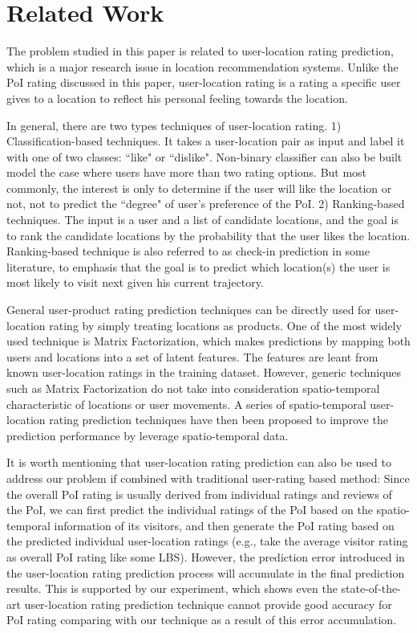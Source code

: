 \section{Related Work}\label{sec:rw}

The problem studied in this paper is related to user-location rating prediction, which is a major research issue in location recommendation systems. Unlike the PoI rating discussed in this paper, user-location rating is a rating a specific user gives to a location to reflect his personal feeling towards the location. 

In general, there are two types techniques of user-location rating. 1) Classification-based techniques. It takes a user-location pair as input and label it with one of two classes: ``like" or ``dislike". Non-binary classifier can also be built model the case where users have more than two rating options. But most commonly, the interest is only to determine if the user will like the location or not, not to predict the ``degree" of user's preference of the PoI. 2) Ranking-based techniques. The input is a user and a list of candidate locations, and the goal is to rank the candidate locations by the probability that the user likes the location. Ranking-based technique is also referred to as check-in prediction in some literature, to emphasis that the goal is to predict which location(s) the user is most likely to visit next given his current trajectory.

General user-product rating prediction techniques can be directly used for user-location rating by simply treating locations as products. One of the most widely used technique is Matrix Factorization, which makes predictions by mapping both users and locations into a set of latent features. The features are leant from known user-location ratings in the training dataset. However, generic techniques such as Matrix Factorization do not take into consideration spatio-temporal characteristic of locations or user movements. A series of spatio-temporal user-location rating prediction techniques have then been proposed to improve the prediction performance by leverage spatio-temporal data. 


It is worth mentioning that user-location rating prediction can also be used to address our problem if combined with traditional user-rating based method: Since the overall PoI rating is usually derived from individual ratings and reviews of the PoI, we can first predict the individual ratings of the PoI based on the spatio-temporal information of its visitors, and then generate the PoI rating based on the predicted individual user-location ratings (e.g., take the average visitor rating as overall PoI rating like some LBS). However, the prediction error introduced in the user-location rating prediction process will accumulate in the final prediction results. This is supported by our experiment, which shows even the state-of-the-art user-location rating prediction technique cannot provide good accuracy for PoI rating comparing with our technique as a result of this error accumulation. 